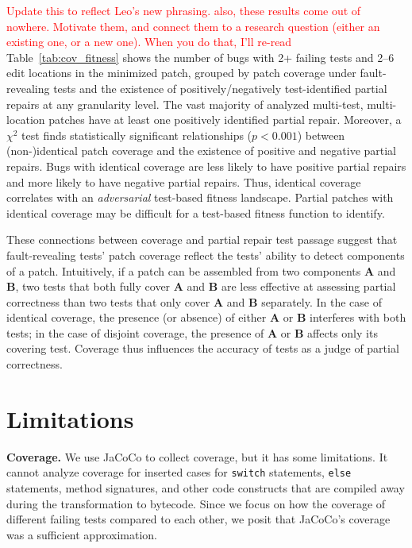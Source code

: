 \documentclass[10pt, conference]{IEEEtran}
\newcommand\todo[1]{\textcolor{red}{#1}}
\begin{document}
\todo{Update this to reflect Leo's new phrasing.}
\todo{also, these results come out of nowhere.  Motivate them, and connect them
  to a research question (either an existing one, or a new one).  When you do
  that, I'll re-read}
Table~\ref{tab:cov_fitness} shows the number of bugs with 2+ failing tests
and 2--6 edit locations in the minimized patch, grouped by patch coverage
under fault-revealing tests and the existence of positively/negatively test-identified
partial repairs at any granularity level.
The vast majority of analyzed multi-test, multi-location patches have at least
one positively identified partial repair.
Moreover, a $\chi^2$ test finds statistically significant relationships ($p < 0.001$)
between (non-)identical patch coverage and the existence of positive and
negative partial repairs. Bugs with identical coverage are less likely to have
positive partial repairs and more likely to have negative partial repairs.
Thus, identical coverage correlates with an
\emph{adversarial} test-based fitness landscape.
Partial patches with identical coverage may be difficult for a test-based
fitness function to identify.

These connections between coverage and partial repair test passage
suggest that fault-revealing tests' patch coverage reflect the tests' ability
to detect components of a patch.
Intuitively, if a patch can be
assembled from two components \textbf{A} and \textbf{B}, two tests that both
fully cover \textbf{A} and \textbf{B} are less effective at assessing partial
correctness than two tests that only cover \textbf{A} and \textbf{B} separately.
In the case of identical coverage, the presence (or absence) of either \textbf{A} or 
\textbf{B} interferes with both tests; in the case of disjoint coverage, the presence of 
\textbf{A} or \textbf{B} affects only its covering test.
Coverage thus influences the accuracy of tests as a judge of partial correctness.


\section{Limitations}
\label{sec:limits}

\noindent\textbf{Coverage.}
We use JaCoCo to collect coverage, but it has some
limitations. It cannot analyze coverage for inserted
cases for \texttt{switch} statements, \texttt{else} statements, method
signatures, and other code constructs that are compiled away during the
transformation to bytecode. Since we focus on how the coverage of different
failing tests compared to each other, we posit that JaCoCo's coverage was a
sufficient approximation.
\end{document}
